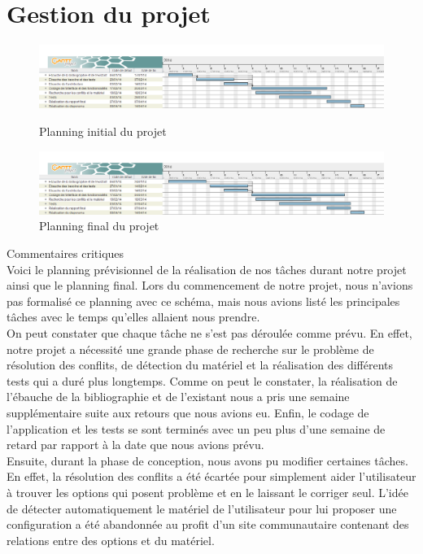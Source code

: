 \documentclass[16pts]{report}
\begin{document}
    \section{Gestion du projet}
    \label{sec:Gestion du projet}

	\begin{figure}
		\includegraphics[scale=0.5]{./illustrations/planning_initial_pdp.png}
		\centering
		\caption{Planning initial du projet}
		\label{fig:PlanningInitial}
		\vspace{10.00mm}
		\includegraphics[scale=0.5]{./illustrations/planning_final_pdp.png}
		\centering
		\caption{Planning final du projet}
		\label{fig:PlanningFinal}
	\end{figure}
	
\newpage
Commentaires critiques\\

	Voici le planning prévisionnel de la réalisation de nos tâches durant 
	notre projet ainsi que le planning final. Lors du commencement de notre 
	projet, nous n'avions pas formalisé ce planning avec ce schéma, mais nous 
	avions listé les principales tâches avec le temps qu'elles allaient 
	nous prendre.
	\\
	
	On peut constater que chaque tâche ne s'est pas déroulée comme prévu.
	En effet, notre projet a nécessité une grande phase de recherche sur le 
	problème de résolution des conflits, de détection du matériel et la 
	réalisation des différents tests qui a duré plus longtemps. 
  Comme on peut le constater, la réalisation de l'ébauche de la bibliographie 
  et de l'existant nous a pris une semaine supplémentaire suite aux retours 
  que nous avions eu. Enfin, le codage de l'application et les tests se sont 
  terminés avec un peu plus d'une semaine de retard par rapport à la date que 
  nous avions prévu.
	\\
	
	Ensuite, durant la phase de conception, nous avons pu modifier 
	certaines tâches. En effet, la résolution des conflits a été écartée pour 
  simplement aider l'utilisateur à trouver les options qui posent	problème 
  et en le laissant le corriger seul. L'idée de détecter 
	automatiquement le matériel de l'utilisateur pour lui proposer une 
	configuration a été abandonnée au profit d'un site communautaire 
	contenant des relations entre des options et du matériel.
\end{document}
